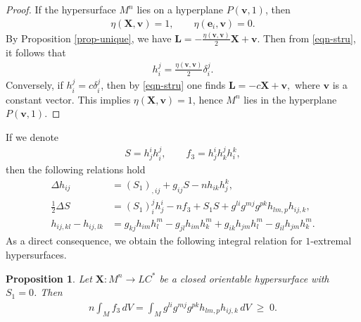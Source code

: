 \documentclass[reqno,11pt, letterpaper]{amsart}
\theoremstyle{plain}
\newtheorem{prop}[thm]{Proposition}
\theoremstyle{definition}
\numberwithin{equation}{section}
\begin{document}
\begin{proof}
	If the hypersurface $M^n$ lies on a hyperplane $P(\mathbf{v},1)$, then
	\begin{align*}
		\eta(\mathbf{X},\mathbf{v})=1, \qquad \eta(\mathbf{e}_i,\mathbf{v})=0.
	\end{align*}
	By Proposition \ref{prop-unique}, we have $\mathbf{L}=-\tfrac{\eta(\mathbf{v},\mathbf{v})}{2}\mathbf{X}+\mathbf{v}.$
	Then from \eqref{eqn-stru}, it follows that
	\begin{align*}
		h^j_i=\frac{\eta(\mathbf{v},\mathbf{v})}{2}\delta^j_i.
	\end{align*}
	Conversely, if $h^j_i=c\delta^j_i$, then by \eqref{eqn-stru} one finds $\mathbf{L}=-c\mathbf{X}+\mathbf{v},$
	where $\mathbf{v}$ is a constant vector. This implies $\eta(\mathbf{X},\mathbf{v})=1$, hence $M^n$ lies in the hyperplane $P(\mathbf{v},1)$.
\end{proof}
%
If we denote
\begin{align*}
	S=h^i_jh^j_i,\qquad f_3=h^i_jh^j_kh^k_i,
\end{align*}
then the following relations hold
\begin{align*}
	\Delta h_{ij}&=\left(S_1\right)_{,ij}+g_{ij}S-nh_{ik}h^k_j,\\
	\tfrac{1}{2}\Delta S&=\left(S_1\right)^j_ih^i_j-nf_3+S_1S
	+g^{li}g^{mj}g^{pk}h_{lm,p}h_{ij,k},\\
	h_{ij,kl}-h_{ij,lk}&=g_{kj}h_{im}h^m_l-g_{jl}h_{im}h^m_k
	+g_{ik}h_{jm}h^m_l-g_{il}h_{jm}h^m_k.
\end{align*}
As a direct consequence, we obtain the following integral relation for $1$-extremal hypersurfaces.
\begin{prop}
	Let $\mathbf{X}:M^n\rightarrow LC^*$ be a closed orientable hypersurface with $S_1=0$. Then
	\begin{align*}
		n\int_M f_3\,dV=\int_M g^{li}g^{mj}g^{pk}h_{lm,p}h_{ij,k}\,dV \;\geq\;0. 
	\end{align*}
\end{prop}
\end{document}

